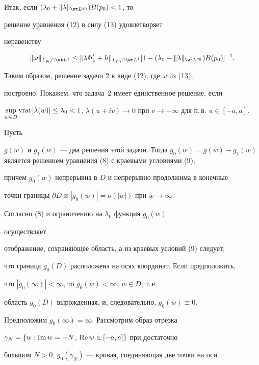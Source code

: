 \begin{pf}
Итак, если $(\lambda_0 + \|\lambda\|_{\wt L^{q_0}}) B(p_0) < 1$, то


решение уравнения (12) в силу (13) удовлетворяет


неравенству


$$


\|\omega\|_{L_{p_0} \cap \wt L^1} \leq \|\lambda \Phi'_1 + h\|_{L_{p_0}


\cap \wt L^1} [1 - (\lambda_0 + \|\lambda\|_{\wt L^{q_0}}) B(p_0)]^{-1}.


$$





Таким образом, решение задачи 2 в виде (12), где $\omega$ из (13),


построено. Покажем, что задача~2 имеет единственное решение, если


$\sup\limits_{w \in D} \vrai |\lambda(w)| \leq \lambda_0 <1$, $\lambda(u+iv)


\to 0$ при $v \to - \infty$ для п.\,в. $u \in [-a, a]$.





Пусть


$g(w)$ и $g_1(w)$ --- два решения этой задачи. Тогда $g_0(w) = g(w) -


g_1(w)$ является решением уравнения (8) с краевыми условиями (9),


причем $g_0(w)$ непрерывна в $D$ и непрерывно продолжима в конечные


точки границы $\partial D$ и $|g_0(w)| = o(|w|)$ при $w \to \infty$.


Согласно (8) и ограничению на $\lambda_0$ функция $g_0(w)$


осуществляет


отображение, сохраняющее область, а из краевых условий (9) следует,


что граница $g_0(D)$ расположена на осях координат. Если предположить,


что $|g_0(\infty)| < \infty$, то $g_0(w) < \infty$, $w \in D$, т.\,е.


область $g_0(D)$ вырожденная, и, следовательно, $g_0(w) \equiv 0$.





Предположим $g_0(\infty) = \infty$. Рассмотрим образ отрезка


$\gamma_N = \{ w: \operatorname{Im} w = - N$, $\operatorname{Re} w \in [-a, a]\}$ при достаточно


большом $N > 0$, $g_0(\gamma_N)$ --- кривая, соединяющая две точки на оси



\end{pf}
